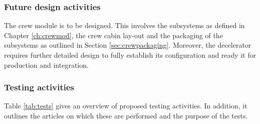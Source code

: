 \subsubsection{Future design activities}
The crew module is to be designed. This involves the subsystems as defined in Chapter \ref{ch:crewmod}, the crew cabin lay-out and the packaging of the subsystems as outlined in Section \ref{sec:crewpackaging}. Moreover, the decelerator requires further detailed design to fully establish its configuration and ready it for production and integration. 

\subsubsection{Testing activities} \label{sec:TestAct}
Table \ref{tab:tests} gives an overview of proposed testing activities. In addition, it outlines the articles on which these are performed and the purpose of the tests.

